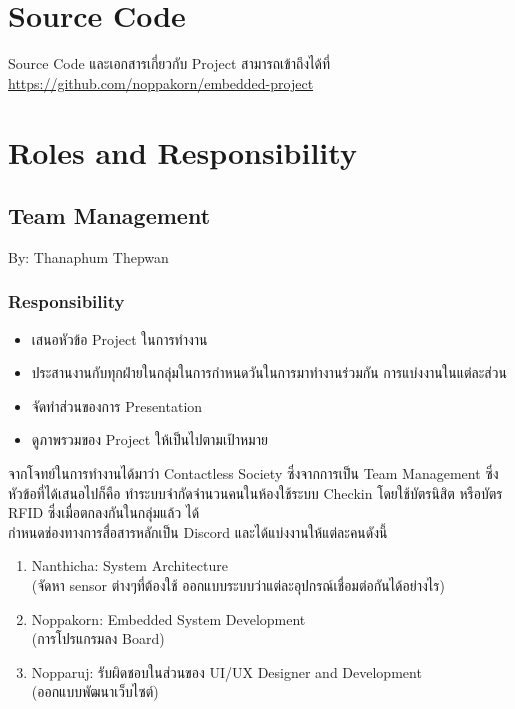 \documentclass[fontsize=14pt]{extarticle}
\begin{document}
\section{Source Code}
Source Code และเอกสารเกี่ยวกับ Project สามารถเข้าถึงได้ที่ \url{https://github.com/noppakorn/embedded-project}
\pagebreak
\section{Roles and Responsibility}
\subsection{Team Management}
By: Thanaphum Thepwan\\
\subsubsection{Responsibility}
\begin{itemize}
    \item เสนอหัวข้อ Project ในการทำงาน
    \item ประสานงานกับทุกฝ่ายในกลุ่มในการกำหนดวันในการมาทำงานร่วมกัน การแบ่งงานในแต่ละส่วน
    \item จัดทำส่วนของการ Presentation
    \item ดูภาพรวมของ Project ให้เป็นไปตามเป้าหมาย
\end{itemize}
จากโจทย์ในการทำงานได้มาว่า Contactless Society ซึ่งจากการเป็น Team Management ซึ่งหัวข้อที่ได้เสนอไปก็คือ ทำระบบจำกัดจำนวนคนในห้องใช้ระบบ Checkin โดยใช้บัตรนิสิต หรือบัตร RFID ซึ่งเมื่อตกลงกันในกลุ่มแล้ว ได้\\กำหนดช่องทางการสื่อสารหลักเป็น Discord และได้แบ่งงานให้แต่ละคนดังนี้
\begin{enumerate}
    \item Nanthicha: System Architecture\\ (จัดหา sensor ต่างๆที่ต้องใช้ ออกแบบระบบว่าแต่ละอุปกรณ์เชื่อมต่อกันได้อย่างไร)
    \item Noppakorn: Embedded System Development \\ (การโปรแกรมลง Board)
    \item Nopparuj: รับผิดชอบในส่วนของ UI/UX Designer and Development\\ (ออกแบบพัฒนาเว็บไซต์)
\end{enumerate}
\end{document}

